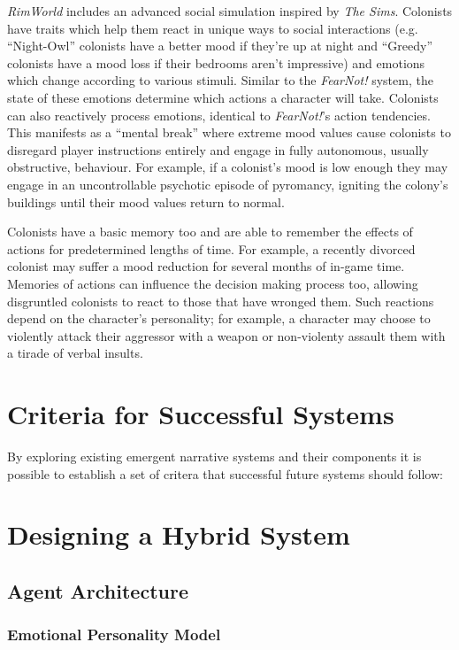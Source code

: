 \documentclass{sig-alternate-05-2015}
\begin{document}
\textit{RimWorld} includes an advanced social simulation inspired by \textit{The Sims}. Colonists have traits which help them react in unique ways to social interactions (e.g. ``Night-Owl'' colonists have a better mood if they're up at night and ``Greedy'' colonists have a mood loss if their bedrooms aren't impressive) and emotions which change according to various stimuli. Similar to the \textit{FearNot!} system, the state of these emotions determine which actions a character will take. Colonists can also reactively process emotions, identical to \textit{FearNot!}'s action tendencies. This manifests as a ``mental break'' where extreme mood values cause colonists to disregard player instructions entirely and engage in fully autonomous, usually obstructive, behaviour. For example, if a colonist's mood is low enough they may engage in an uncontrollable psychotic episode of pyromancy, igniting the colony's buildings until their mood values return to normal.

Colonists have a basic memory too and are able to remember the effects of actions for predetermined lengths of time. For example, a recently divorced colonist may suffer a mood reduction for several months of in-game time. Memories of actions can influence the decision making process too, allowing disgruntled colonists to react to those that have wronged them. Such reactions depend on the character's personality; for example, a character may choose to violently attack their aggressor with a weapon or non-violenty assault them with a tirade of verbal insults.

\section{Criteria for Successful Systems}
\noindent By exploring existing emergent narrative systems and their components it is possible to establish a set of critera that successful future systems should follow:

\section{Designing a Hybrid System}
\subsection{Agent Architecture}
\subsubsection{Emotional Personality Model}
\end{document}
